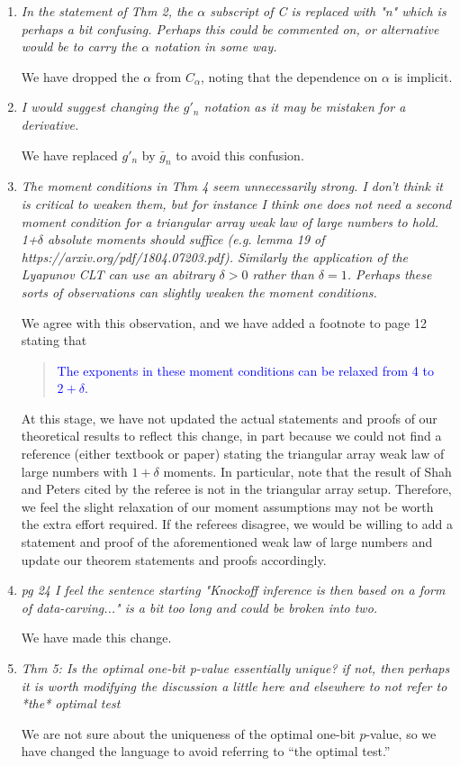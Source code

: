\documentclass[12pt]{article}
\begin{document}
\begin{enumerate}
	\item \textsl{In the statement of Thm 2, the $\alpha$ subscript of C is replaced with "n" which is perhaps a bit confusing. Perhaps this could be commented on, or alternative would be to carry the $\alpha$ notation in some way.}

	We have dropped the $\alpha$ from $C_\alpha$, noting that the dependence on $\alpha$ is implicit.

	\item \textsl{I would suggest changing the $g'_n$ notation as it may be mistaken for a derivative.}
	
	We have replaced $g'_n$ by $\bar g_n$ to avoid this confusion.

	\item \textsl{The moment conditions in Thm 4 seem unnecessarily strong. I don't think it is critical to weaken them, but for instance I think one does not need a second moment condition for a triangular array weak law of large numbers to hold. 1+$\delta$ absolute moments should suffice (e.g. lemma 19 of https://arxiv.org/pdf/1804.07203.pdf). Similarly the application of the Lyapunov CLT can use an abitrary $\delta > 0$ rather than $\delta=1$. Perhaps these sorts of observations can slightly weaken the moment conditions.}
	
	We agree with this observation, and we have added a footnote to page 12 stating that
	\begin{quote}
	\textcolor{blue}{The exponents in these moment conditions can be relaxed from 4 to $2+\delta$.}
	\end{quote}
	At this stage, we have not updated the actual statements and proofs of our theoretical results to reflect this change, in part because we could not find a reference (either textbook or paper) stating the triangular array weak law of large numbers with $1+\delta$ moments. In particular, note that the result of Shah and Peters cited by the referee is not in the triangular array setup. Therefore, we feel the slight relaxation of our moment assumptions may not be worth the extra effort required. If the referees disagree, we would be willing to add a statement and proof of the aforementioned weak law of large numbers and update our theorem statements and proofs accordingly.

	\item \textsl{pg 24 I feel the sentence starting "Knockoff inference is then based on a form of data-carving..." is a bit too long and could be broken into two.}
	
	We have made this change. 

	\item \textsl{Thm 5: Is the optimal one-bit p-value essentially unique? if not, then perhaps it is worth modifying the discussion a little here and elsewhere to not refer to *the* optimal test}
	
	We are not sure about the uniqueness of the optimal one-bit $p$-value, so we have changed the language to avoid referring to ``the optimal test.''

\end{enumerate}
\end{document}
